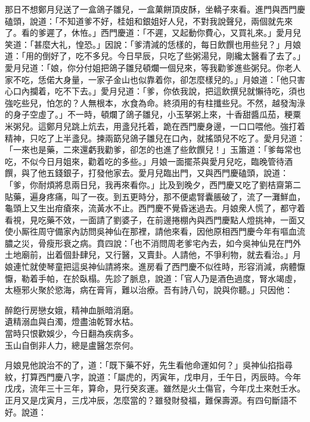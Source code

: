那日不想鄭月兒送了一盒鴿子雛兒，一盒菓餅頂皮酥，坐轎子來看。進門與西門慶磕頭，說道：「不知道爹不好，桂姐和銀姐好人兒，不對我說聲兒，兩個就先來了。看的爹遲了，休恠。」西門慶道：「不遲，又起動你費心，又買礼來。」愛月兒笑道：「甚麼大礼，惶恐。」因說：「爹清減的恁樣的，每日飲饌也用些兒？」月娘道：「用的倒好了，吃不多兒。今日早辰，只吃了些粥湯兒，剛纔太醫看了去了。」愛月兒道：「娘，你分付姐把鴿子雛兒頓爛一個兒來，等我勸爹進些粥兒。你老人家不吃，恁偌大身量，一家子金山也似靠着你，卻怎麼樣兒的。」月娘道：「他只害心口內攔着，吃不下去。」愛月兒道：「爹，你依我說，把這飲撰兒就懶待吃，須也強吃些兒，怕怎的？人無根本，水食為命。終須用的有柱攕些兒。不然，越發淘淥的身子空虛了。」不一時，頓爛了鴿子雛兒，小玉拏粥上來，十香甜醬瓜茄，粳粟米粥兒。這鄭月兒跳上炕去，用盞兒托着，跪在西門慶身邊，一口口喂他。強打着精神，只吃了上半盞兒。揀兩筯兒鴿子雛兒在口內，就搖頭兒不吃了。愛月兒道：「一來也是藥，{}二來還虧我勸爹，卻怎的也進了些飲饌兒！」玉簫道：「爹每常也吃，不似今日月姐來，勸着吃的多些。」月娘一面擺茶與愛月兒吃，臨晚管待酒饌，與了他五錢銀子，打發他家去。愛月兒臨出門，又與西門慶磕頭，說道：「爹，你耐煩將息兩日兒，我再來看你。」比及到晚夕，西門慶又吃了劉桔齋第二貼藥，遍身疼痛，叫了一夜。到五更時分，那不便處腎囊脹破了，流了一灘鮮血，龜頭上又生出疳瘡來，流黃水不止。{}西門慶不覺昏迷過去。月娘衆人慌了，都守着看視，見吃藥不效，一面請了劉婆子，在前邊捲棚內與西門慶點人燈挑神，一面又使小厮徃周守備家內訪問吳神仙在那裡，請他來看，因他原相西門慶今年有嘔血流膿之災，骨瘦形衰之病。賁四說：「也不消問周老爹宅內去，如今吳神仙見在門外土地廟前，出着個卦肆兒，又行醫，又賣卦。人請他，不爭利物，就去看治。」月娘連忙就使琴童把這吳神仙請將來。進房看了西門慶不似徃時，形容消減，病體懨懨，勒着手帕，在於臥榻。先診了脈息，說道：「官人乃是酒色過度，腎水竭虛，太極邪火聚於慾海，病在膏肓，難以治療。吾有詩八句，說與你聽。」只因他：

\begin{myquote} 
醉飽行房戀女娥，精神血脈暗消磨。\\遺精溺血與白濁，燈盡油乾腎水枯。\\當時只恨歡娛少，今日翻為疾病多。\\玉山自倒非人力，總是盧醫怎奈何。
\end{myquote} 

月娘見他說治不的了，道：「既下藥不好，先生看他命運如何？」吳神仙掐指尋紋，打算西門慶八字，說道：「屬虎的，丙寅年，戊申月，壬午日，丙辰時。今年戊戌，流年三十三年，算命，見行癸亥運。雖然是火土傷官，今年戊土來尅壬水。正月又是戊寅月，三戊冲辰，怎麼當的？雖發財發福，難保壽源。有四句斷語不好。說道：

